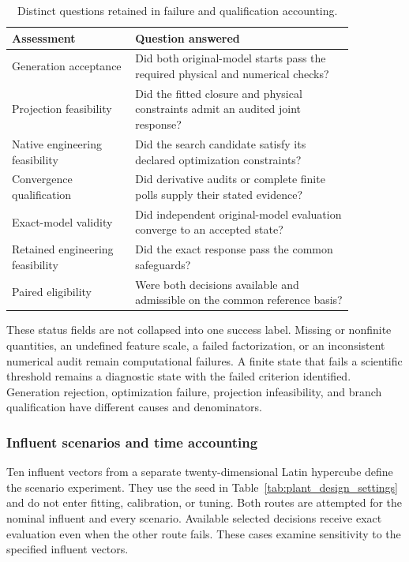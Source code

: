 \begin{table}[htbp]
\centering\small
\caption{Distinct questions retained in failure and qualification accounting.}
\label{tab:plant_failure_classes}
\begin{tabular}{p{0.31\linewidth}p{0.55\linewidth}}
\toprule Assessment & Question answered\\\midrule
Generation acceptance & Did both original-model starts pass the required physical and numerical checks?\\
Projection feasibility & Did the fitted closure and physical constraints admit an audited joint response?\\
Native engineering feasibility & Did the search candidate satisfy its declared optimization constraints?\\
Convergence qualification & Did derivative audits or complete finite polls supply their stated evidence?\\
Exact-model validity & Did independent original-model evaluation converge to an accepted state?\\
Retained engineering feasibility & Did the exact response pass the common safeguards?\\
Paired eligibility & Were both decisions available and admissible on the common reference basis?\\
\bottomrule
\end{tabular}
\end{table}

These status fields are not collapsed into one success label. Missing or nonfinite quantities, an undefined feature scale, a failed factorization, or an inconsistent numerical audit remain computational failures. A finite state that fails a scientific threshold remains a diagnostic state with the failed criterion identified. Generation rejection, optimization failure, projection infeasibility, and branch qualification have different causes and denominators.

\subsubsection{Influent scenarios and time accounting}

Ten influent vectors from a separate twenty-dimensional Latin hypercube define the scenario experiment. They use the seed in Table~\ref{tab:plant_design_settings} and do not enter fitting, calibration, or tuning. Both routes are attempted for the nominal influent and every scenario. Available selected decisions receive exact evaluation even when the other route fails. These cases examine sensitivity to the specified influent vectors.

